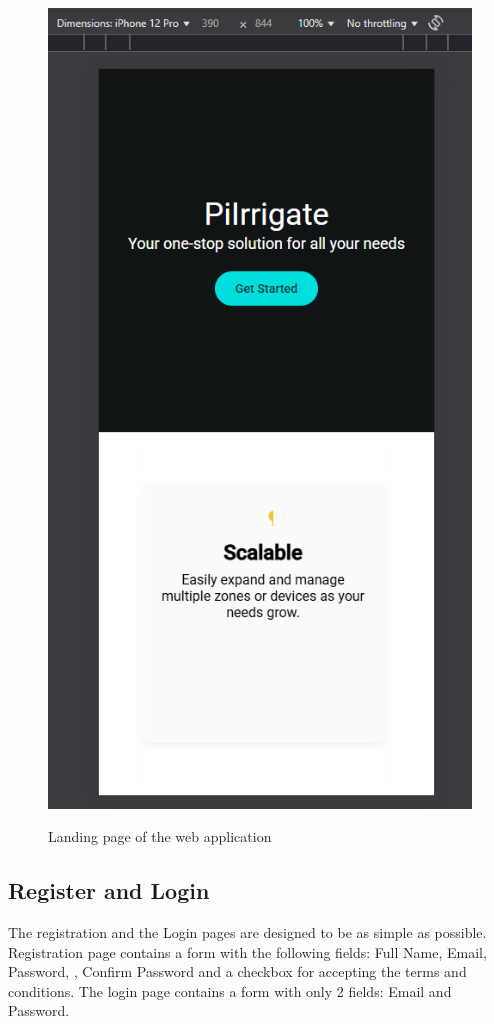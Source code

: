 \begin{figure}[H]
\begin{minipage}{0.3\textwidth}
        \includegraphics[width=\textwidth]{images/landing_12_pro.png}
        \label{fig:landing-page-mobile}
    \end{minipage}
    \caption{Landing page of the web application}
\end{figure}

\subsection{Register and Login}
The registration and the Login pages are designed to be as simple as possible. 
Registration page contains a form with the following fields: Full Name, Email, Password,
, Confirm Password and a checkbox for accepting the terms and conditions. 
The login page contains a form with only 2 fields: Email and Password.


